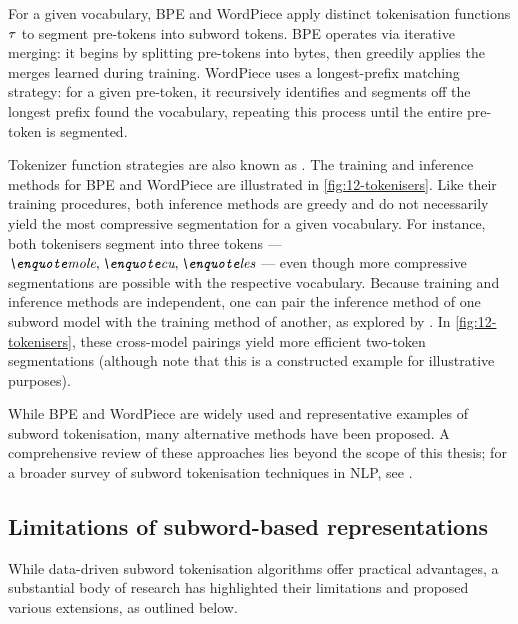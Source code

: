 For a given vocabulary, BPE and WordPiece apply distinct tokenisation functions $\tau$ to segment pre-tokens into subword tokens. BPE operates via iterative merging: it begins by splitting pre-tokens into bytes, then greedily applies the merges learned during training. WordPiece uses a longest-prefix matching strategy: for a given pre-token, it recursively identifies and segments off the longest prefix found the vocabulary, repeating this process until the entire pre-token is segmented.

Tokenizer function strategies are also known as . The training and inference methods for BPE and WordPiece are illustrated in \cref{fig:12-tokenisers}. Like their training procedures, both inference methods are greedy and do not necessarily yield the most compressive segmentation for a given vocabulary. For instance, both tokenisers segment  into three tokens --- ${\ex{mole},\ex{cu},\ex{les}}$ --- even though more compressive segmentations are possible with the respective vocabulary. Because training and inference methods are independent, one can pair the inference method of one subword model with the training method of another, as explored by \citet{uzan-etal-2024-greed}. In \cref{fig:12-tokenisers}, these cross-model pairings yield more efficient two-token segmentations (although note that this is a constructed example for illustrative purposes). 

While BPE and WordPiece are widely used and representative examples of subword tokenisation, many alternative methods have been proposed. A comprehensive review of these approaches lies beyond the scope of this thesis; for a broader survey of subword tokenisation techniques in NLP, see \citet{mielke2021between}.

\subsection{Limitations of subword-based representations}

While data-driven subword tokenisation algorithms offer practical advantages, a substantial body of research has highlighted their limitations and proposed various extensions, as outlined below.

